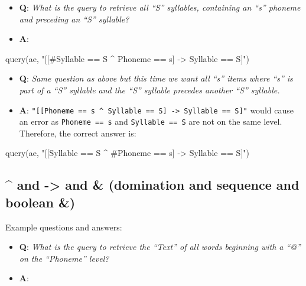 \documentclass[
]{book}
\newenvironment{Shaded}{\begin{snugshade}}{\end{snugshade}}
\newcommand{\FunctionTok}[1]{\textcolor[rgb]{0.00,0.00,0.00}{#1}}
\newcommand{\NormalTok}[1]{#1}
\newcommand{\StringTok}[1]{\textcolor[rgb]{0.31,0.60,0.02}{#1}}
\providecommand{\tightlist}{%
  \setlength{\itemsep}{0pt}\setlength{\parskip}{0pt}}
\begin{document}
\begin{itemize}
\tightlist
\item
  \textbf{Q}: \emph{What is the query to retrieve all ``S'' syllables, containing an ``s'' phoneme and preceding an ``S'' syllable?}
\item
  \textbf{A}:
\end{itemize}

\begin{Shaded}
\begin{Highlighting}[]
\FunctionTok{query}\NormalTok{(ae, }\StringTok{"[[\#Syllable == S \^{} Phoneme == s] {-}\textgreater{} Syllable == S]"}\NormalTok{)}
\end{Highlighting}
\end{Shaded}

\begin{itemize}
\tightlist
\item
  \textbf{Q}: \emph{Same question as above but this time we want all ``s'' items where ``s'' is part of a ``S'' syllable and the ``S'' syllable precedes another ``S'' syllable.}
\item
  \textbf{A}:
  \texttt{"{[}{[}Phoneme\ ==\ s\ \^{}\ Syllable\ ==\ S{]}\ -\textgreater{}\ Syllable\ ==\ S{]}"} would cause an error as \texttt{Phoneme\ ==\ s} and \texttt{Syllable\ ==\ S} are not on the same level. Therefore, the correct answer is:
\end{itemize}

\begin{Shaded}
\begin{Highlighting}[]
\FunctionTok{query}\NormalTok{(ae, }\StringTok{"[[Syllable == S \^{} \#Phoneme == s] {-}\textgreater{} Syllable == S]"}\NormalTok{)}
\end{Highlighting}
\end{Shaded}

\hypertarget{and---and-domination-and-sequence-and-boolean}{%
\subsection{\^{} and -\textgreater{} and \& (domination and sequence and boolean \&)}\label{and---and-domination-and-sequence-and-boolean}}

Example questions and answers:

\begin{itemize}
\tightlist
\item
  \textbf{Q}: \emph{What is the query to retrieve the ``Text'' of all words beginning with a ``@'' on the ``Phoneme'' level?}
\item
  \textbf{A}:
\end{itemize}
\end{document}
